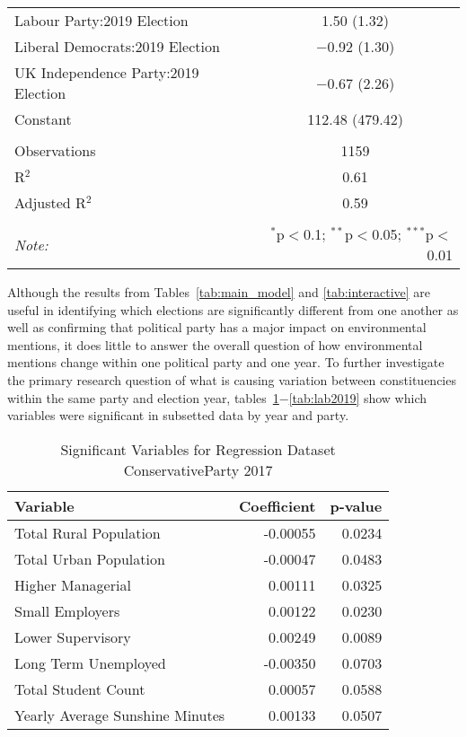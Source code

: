 \documentclass[12pt,letterpaper]{article}
\begin{document}
\begin{table}[H]
\begin{tabular}{@{\extracolsep{5pt}}lc}
		Labour Party:2019 Election & 1.50 (1.32) \\ 
		Liberal Democrats:2019 Election & $-$0.92 (1.30) \\ 
		UK Independence Party:2019 Election & $-$0.67 (2.26) \\ 
		Constant & 112.48 (479.42) \\ 
		\hline \\[-1.8ex] 
		Observations & 1159 \\ 
		R$^{2}$ & 0.61 \\ 
		Adjusted R$^{2}$ & 0.59 \\ 
		\hline 
		\hline \\[-1.8ex] 
		\textit{Note:}  & \multicolumn{1}{r}{$^{*}$p$<$0.1; $^{**}$p$<$0.05; $^{***}$p$<$0.01} \\ 
	\end{tabular} 
\end{table} 


\newpage

\pagestyle{plain}

Although the results from Tables~\ref{tab:main_model} and \ref{tab:interactive} are useful in identifying which elections are significantly different from one another as well as confirming that political party has a major impact on environmental mentions, it does little to answer the overall question of how environmental mentions change within one political party and one year. To further investigate the primary research question of what is causing variation between constituencies within the same party and election year, tables~\ref{tab:cons2017}$-$\ref{tab:lab2019} show which variables were significant in subsetted data by year and party.

\begin{table}[h!]
	\caption{Significant Variables for Regression Dataset ConservativeParty 2017}
	\label{tab:cons2017}
	\centering
	\begin{tabular}{|l|r|r|}
		\hline
		\textbf{Variable} & \textbf{Coefficient} & \textbf{p-value} \\
		\hline
		Total Rural Population & -0.00055 & 0.0234 \\
		Total Urban Population & -0.00047 & 0.0483 \\
		Higher Managerial & 0.00111 & 0.0325 \\
		Small Employers & 0.00122 & 0.0230 \\
		Lower Supervisory & 0.00249 & 0.0089 \\
		Long Term Unemployed & -0.00350 & 0.0703 \\
		Total Student Count & 0.00057 & 0.0588 \\
		Yearly Average Sunshine Minutes & 0.00133 & 0.0507 \\
		\hline
	\end{tabular}
\end{table}
\end{document}
